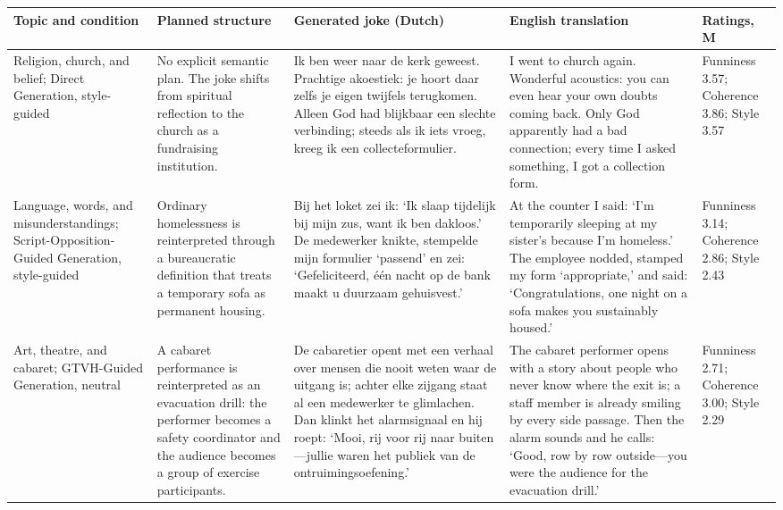 \documentclass[11pt]{article}
\begin{document}
\begin{table}[t]\centering\scriptsize\begin{tabularx}{\textwidth}{YYYYY}
\toprule\noalign{}
Topic and condition & Planned structure & Generated joke (Dutch) & English translation & Ratings, M \\
\midrule\noalign{}

\bottomrule\noalign{}

Religion, church, and belief; Direct Generation, style-guided & No explicit semantic plan. The joke shifts from spiritual reflection to the church as a fundraising institution. & Ik ben weer naar de kerk geweest. Prachtige akoestiek: je hoort daar zelfs je eigen twijfels terugkomen. Alleen God had blijkbaar een slechte verbinding; steeds als ik iets vroeg, kreeg ik een collecteformulier. & I went to church again. Wonderful acoustics: you can even hear your own doubts coming back. Only God apparently had a bad connection; every time I asked something, I got a collection form. & Funniness 3.57; Coherence 3.86; Style 3.57 \\
Language, words, and misunderstandings; Script-Opposition-Guided Generation, style-guided & Ordinary homelessness is reinterpreted through a bureaucratic definition that treats a temporary sofa as permanent housing. & Bij het loket zei ik: `Ik slaap tijdelijk bij mijn zus, want ik ben dakloos.' De medewerker knikte, stempelde mijn formulier `passend' en zei: `Gefeliciteerd, één nacht op de bank maakt u duurzaam gehuisvest.' & At the counter I said: `I'm temporarily sleeping at my sister's because I'm homeless.' The employee nodded, stamped my form `appropriate,' and said: `Congratulations, one night on a sofa makes you sustainably housed.' & Funniness 3.14; Coherence 2.86; Style 2.43 \\
Art, theatre, and cabaret; GTVH-Guided Generation, neutral & A cabaret performance is reinterpreted as an evacuation drill: the performer becomes a safety coordinator and the audience becomes a group of exercise participants. & De cabaretier opent met een verhaal over mensen die nooit weten waar de uitgang is; achter elke zijgang staat al een medewerker te glimlachen. Dan klinkt het alarmsignaal en hij roept: `Mooi, rij voor rij naar buiten---jullie waren het publiek van de ontruimingsoefening.' & The cabaret performer opens with a story about people who never know where the exit is; a staff member is already smiling by every side passage. Then the alarm sounds and he calls: `Good, row by row outside---you were the audience for the evacuation drill.' & Funniness 2.71; Coherence 3.00; Style 2.29 \\
\end{tabularx}\end{table}
\end{document}
